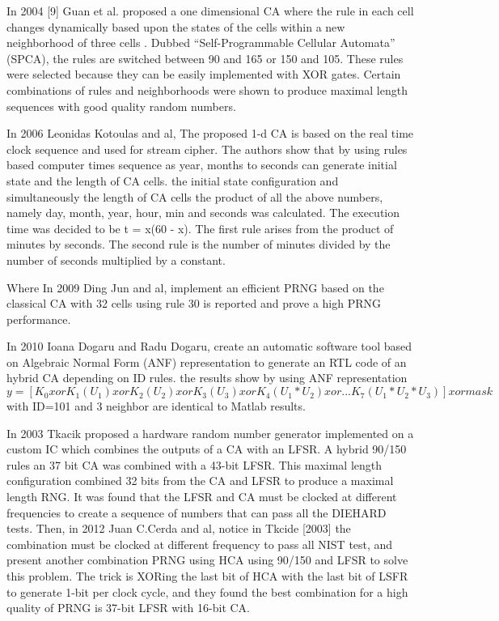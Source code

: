 %

In 2004 [9] Guan et al. proposed a one dimensional CA where the rule in each cell changes dynamically based upon the states of the cells within a new neighborhood of three cells . Dubbed “Self-Programmable Cellular Automata” (SPCA), the rules are switched between 90 and 165 or 150 and 105. These rules were selected because they can be easily implemented with XOR gates. Certain combinations of rules and neighborhoods were shown to produce maximal length sequences with good quality random numbers.

In 2006 Leonidas Kotoulas and al, The proposed 1-d CA is based on the real time clock sequence and used for stream cipher. The authors show that by using rules based computer times sequence as year, months to seconds can generate initial state and the length of CA cells. the initial state configuration and simultaneously the length of CA cells the product of all the above numbers, namely day, month, year, hour, min and seconds was calculated. The execution time was decided to be t = x(60 - x). The first rule arises from the product of minutes by seconds. The second rule is the number of minutes divided by the number of seconds multiplied by a constant.

Where In 2009 Ding Jun and al, implement an efficient PRNG based on the classical CA with 32 cells using rule 30 is reported and prove a high PRNG performance. 

In 2010 Ioana Dogaru and Radu Dogaru, create an automatic software tool based on Algebraic Normal Form (ANF) representation to generate an RTL code of an hybrid CA depending on ID rules. the results show by using ANF representation  $y = [K_{0} xor K_{1}(U_{1}) xor K_{2}(U_{2}) xor K_{3}(U_{3}) xor K_{4}(U_{1}*U_{2}) xor ... K_{7}(U_{1}*U_{2}*U_{3})] xor mask$ with ID=101 and 3 neighbor are identical to Matlab results.

In 2003 Tkacik proposed a hardware random number generator implemented on a custom IC which combines the outputs of a CA with an LFSR. A hybrid 90/150 rules an 37 bit CA was combined with a 43-bit LFSR. This maximal length configuration combined 32 bits from the CA and LFSR to produce a maximal length RNG. It was found that the LFSR and CA must be clocked at different frequencies to create a sequence of numbers that can pass all the DIEHARD tests. Then, in 2012 Juan C.Cerda and al, notice in Tkcide [2003] the combination must be clocked at different frequency to pass all NIST test, and present another combination PRNG using HCA using 90/150 and LFSR to solve this problem. The trick is XORing the last bit of HCA with the last bit of LSFR to generate 1-bit per clock cycle, and they found the best combination for a high quality of PRNG is 37-bit LFSR with 16-bit CA. 

